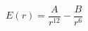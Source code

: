 \documentclass[12pt]{article}
\begin{document}
$$
   E(r) = \frac{A}{r^{12}} - \frac{B}{r^{6}}
$$
\end{document}
